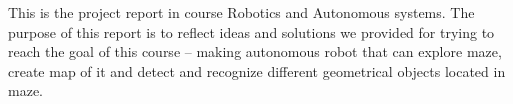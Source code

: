 This is the project report in course Robotics and Autonomous systems. The purpose of this report is to reflect ideas and solutions we provided for trying to reach the goal of this course – making autonomous robot that can explore maze, create map of it and detect and recognize different geometrical objects located in maze.